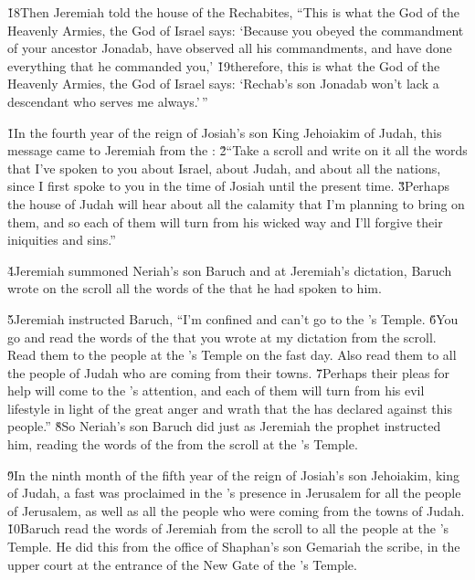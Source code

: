 \v{18}Then Jeremiah told the house of the Rechabites, ``This is what the  God of the Heavenly Armies, the God of Israel says: `Because you obeyed the commandment of your ancestor Jonadab, have observed all his commandments, and have done everything that he commanded you,' \v{19}therefore, this is what the  God of the Heavenly Armies, the God of Israel says: `Rechab's son Jonadab won't lack a descendant who serves me always.'\,''

\v{1}In the fourth year of the reign of Josiah's son King Jehoiakim of Judah, this message came to Jeremiah from the : \v{2}``Take a scroll and write on it all the words that I've spoken to you about Israel, about Judah, and about all the nations, since I first spoke to you in the time of Josiah until the present time. \v{3}Perhaps the house of Judah will hear about all the calamity that I'm planning to bring on them, and so each of them will turn from his wicked way and I'll forgive their iniquities and sins.''

\v{4}Jeremiah summoned Neriah's son Baruch and at Jeremiah's dictation, Baruch wrote on the scroll all the words of the  that he had spoken to him.

\v{5}Jeremiah instructed Baruch, ``I'm confined and can't go to the 's Temple. \v{6}You go and read the words of the  that you wrote at my dictation from the scroll. Read them to the people at the 's Temple on the fast day. Also read them to all the people of Judah who are coming from their towns. \v{7}Perhaps their pleas for help will come to the 's attention, and each of them will turn from his evil lifestyle in light of the great anger and wrath that the  has declared against this people.'' \v{8}So Neriah's son Baruch did just as Jeremiah the prophet instructed him, reading the words of the  from the scroll at the 's Temple.

\v{9}In the ninth month of the fifth year of the reign of Josiah's son Jehoiakim, king of Judah, a fast was proclaimed in the 's presence in Jerusalem for all the people of Jerusalem, as well as all the people who were coming from the towns of Judah. \v{10}Baruch read the words of Jeremiah from the scroll to all the people at the 's Temple. He did this from the office of Shaphan's son Gemariah the scribe, in the upper court at the entrance of the New Gate of the 's Temple.

